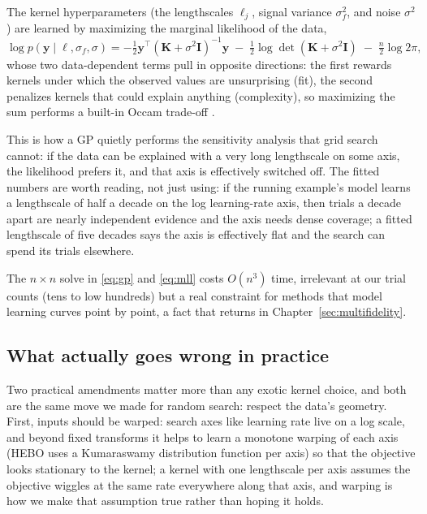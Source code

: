 The kernel hyperparameters (the lengthscales $\ell_j$, signal variance
$\sigma_f^2$, and noise $\sigma^2$) are learned by maximizing the marginal
likelihood of the data,
\begin{equation}
\log p(\mathbf{y} \mid \boldsymbol{\ell}, \sigma_f, \sigma)
= -\tfrac{1}{2} \mathbf{y}^\top (\mathbf{K} + \sigma^2 \mathbf{I})^{-1}
   \mathbf{y}
  \;-\; \tfrac{1}{2} \log \det (\mathbf{K} + \sigma^2 \mathbf{I})
  \;-\; \tfrac{n}{2} \log 2\pi ,
\label{eq:mll}
\end{equation}
whose two data-dependent terms pull in opposite directions: the first
rewards kernels under which the observed values are unsurprising (fit), the
second penalizes kernels that could explain anything (complexity), so
maximizing the sum performs a built-in Occam trade-off
\citep{rasmussen2006gaussian}.

This is how a GP quietly performs the
sensitivity analysis that grid search cannot: if the data can be explained
with a very long lengthscale on some axis, the likelihood prefers it, and
that axis is effectively switched off. The fitted numbers are worth
reading, not just using: if the running example's model learns a
lengthscale of half a decade on the log learning-rate axis, then trials
a decade apart are nearly independent evidence and the axis needs dense
coverage; a fitted lengthscale of five decades says the axis is
effectively flat and the search can spend its trials elsewhere.

The $n \times n$ solve in
\eqref{eq:gp} and \eqref{eq:mll} costs $O(n^3)$ time, irrelevant at our
trial counts (tens to low hundreds) but a real constraint for methods that
model learning curves point by point, a fact that returns in
Chapter~\ref{sec:multifidelity}.

\subsection{What actually goes wrong in practice}
\label{sec:gp-practical}

Two practical amendments matter more than any exotic kernel choice, and
both are the same move we made for random search: respect the data's
geometry. First, inputs should be warped: search axes like learning rate
live on a log scale, and beyond fixed transforms it helps to learn a
monotone warping of each axis (HEBO uses a Kumaraswamy distribution
function per axis) so that the objective looks stationary to the kernel;
a kernel with one lengthscale per axis assumes the objective wiggles at
the same rate everywhere along that axis, and warping is how we make that
assumption true rather than hoping it holds.

